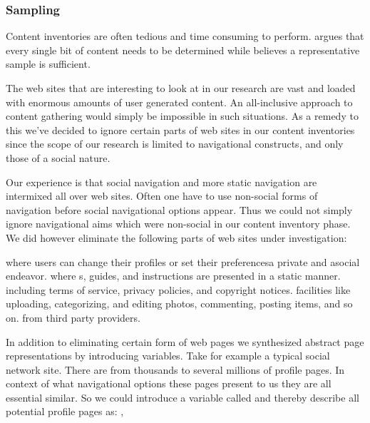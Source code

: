 \subsubsection{Sampling}
\label{section:methodology.content.analysis.sampling}

Content inventories are often tedious and time consuming to perform.
\citet[]{wodtke02} argues that every single bit of content needs to be
determined while \citet[]{morville06} believes a representative sample
is sufficient.

The web sites that are interesting to look at in our research are vast and
loaded with enormous amounts of user generated content. An all-inclusive
approach to content gathering would simply be impossible in such situations.
As a remedy to this we've decided to ignore certain parts of web sites in our
content inventories since the scope of our research is limited to navigational
constructs, and only those of a social nature.

Our experience is that social navigation and more static navigation are
intermixed all over web sites. Often one have to use non-social forms of
navigation before social navigational options appear. Thus we could not simply
ignore navigational aims which were non-social in our content inventory phase.
We did however eliminate the following parts of web sites under investigation:

\begin{enum}
   where users can change their profiles or set
    their preferences\dash{}a private and asocial endeavor.
   where s, guides, and instructions are presented
    in a static manner.
   including terms of service, privacy policies, and
    copyright notices.
   facilities like uploading, categorizing, and
    editing photos, commenting, posting items, and so on.%
   from third party providers.
\end{enum}

In addition to eliminating certain form of web pages we synthesized abstract
page representations by introducing variables. Take for example a typical
social network site. There are from thousands to several millions of
profile pages. In context of what navigational options these pages present to
us they are all essential similar. So we could introduce a variable called
%
and thereby describe all potential profile pages as:
,

